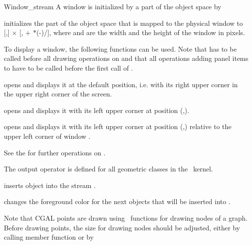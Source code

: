 \begin{ccRefClass} {Window_stream}
\ccOperations
A window is initialized by a part of the object space by

{initializes the  part of the object space that is mapped to the physical
window to [,] $\times$ 
[, + $*$(-)/],
where  and  are the width and the height of the window in pixels.}

To display a window, the following functions can be used. Note that  
has to be called before all drawing operations on  and that all operations adding 
panel items to  have to be called before the first call of .

{opens  and displays it at the default position, i.e. 
with its right upper corner in the upper right corner of the screen.}

{opens  and displays it with its left upper corner at position
(,).}

\def\ccTagRmEigenClassName{\ccFalse}

{opens  and displays it with its left upper corner at position 
(,) relative to the upper left corner of  window .}

See the 
\cite{cgal:mnsu-lum} for further operations on .


The output operator is defined for all geometric classes in the \cgal\ kernel.

       {inserts object  into the stream \ccVar.}

       {changes the foreground color for the next objects that
        will be inserted into \ccVar.}

Note that CGAL points are drawn using \leda\ functions for drawing nodes of a graph.
Before drawing points, the size for drawing nodes should be adjusted, either by calling
member function  or by 


\end{ccRefClass}
